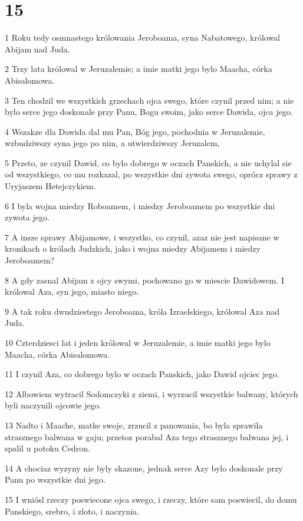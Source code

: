 \chapter{15}

\par 1 Roku tedy osmnastego królowania Jeroboama, syna Nabatowego, królowal Abijam nad Juda.
\par 2 Trzy lata królowal w Jeruzalemie; a imie matki jego bylo Maacha, córka Abisalomowa.
\par 3 Ten chodzil we wszystkich grzechach ojca swego, które czynil przed nim; a nie bylo serce jego doskonale przy Panu, Bogu swoim, jako serce Dawida, ojca jego.
\par 4 Wszakze dla Dawida dal mu Pan, Bóg jego, pochodnia w Jeruzalemie, wzbudziwszy syna jego po nim, a utwierdziwszy Jeruzalem,
\par 5 Przeto, ze czynil Dawid, co bylo dobrego w oczach Panskich, a nie uchylal sie od wszystkiego, co mu rozkazal, po wszystkie dni zywota swego, oprócz sprawy z Uryjaszem Hetejczykiem.
\par 6 I byla wojna miedzy Roboamem, i miedzy Jeroboamem po wszystkie dni zywota jego.
\par 7 A insze sprawy Abijamowe, i wszystko, co czynil, azaz nie jest napisane w kronikach o królach Judzkich, jako i wojna miedzy Abijamem i miedzy Jeroboamem?
\par 8 A gdy zasnal Abijam z ojcy swymi, pochowano go w miescie Dawidowem. I królowal Aza, syn jego, miasto niego.
\par 9 A tak roku dwudziestego Jeroboama, króla Izraelskiego, królowal Aza nad Juda.
\par 10 Czterdziesci lat i jeden królowal w Jeruzalemie, a imie matki jego bylo Maacha, córka Abisalomowa.
\par 11 I czynil Aza, co dobrego bylo w oczach Panskich, jako Dawid ojciec jego.
\par 12 Albowiem wytracil Sodomczyki z ziemi, i wyrzucil wszystkie balwany, których byli naczynili ojcowie jego.
\par 13 Nadto i Maache, matke swoje, zrzucil z panowania, bo byla sprawila strasznego balwana w gaju; przetoz porabal Aza tego strasznego balwana jej, i spalil u potoku Cedron.
\par 14 A chociaz wyzyny nie byly skazone, jednak serce Azy bylo doskonale przy Panu po wszystkie dni jego.
\par 15 I wniósl rzeczy poswiecone ojca swego, i rzeczy, które sam poswiecil, do domu Panskiego, srebro, i zloto, i naczynia.
